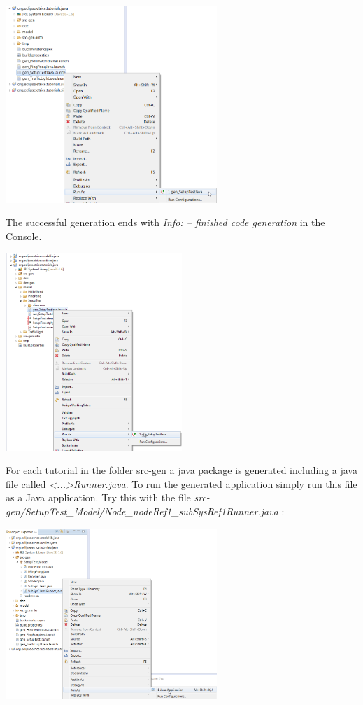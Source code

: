 \includegraphics[width=0.6\textwidth]{images/013-SetupWorkspace05.png}

The successful generation ends with \emph{Info: -- finished code generation} in the Console.

\includegraphics[width=0.5\textwidth]{images/013-SetupWorkspace051.png}

For each tutorial in the folder src-gen a java package is generated including a java file called 
\emph{<...>Runner.java}. To run the generated application simply run this file as a Java application.
Try this with the file \emph{src-gen/SetupTest\_Model/Node\_nodeRef1\_subSysRef1Runner.java} :

\includegraphics[width=0.6\textwidth]{images/013-SetupWorkspace06.png}

